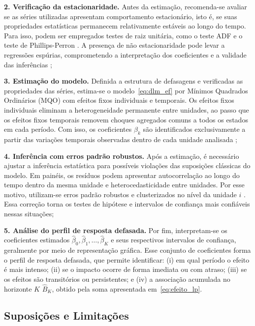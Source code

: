 \textbf{2. Verificação da estacionaridade.} Antes da estimação, recomenda-se avaliar
se as séries utilizadas apresentam comportamento estacionário, isto é, se suas
propriedades estatísticas permanecem relativamente estáveis ao longo do tempo. Para
isso, podem ser empregados testes de raiz unitária, como o teste ADF
\citep{dickey1979} e o teste de Phillips-Perron \citep{phillips1988}. A presença de
não estacionaridade pode levar a regressões espúrias, comprometendo a interpretação
dos coeficientes e a validade das inferências \citep{greene2012};

\textbf{3. Estimação do modelo.} Definida a estrutura de defasagens e verificadas as propriedades das séries, estima-se o modelo~\eqref{eq:dlm_ef} por Mínimos Quadrados Ordinários (MQO) com efeitos fixos individuais e temporais. Os efeitos fixos individuais eliminam a heterogeneidade permanente entre unidades, ao passo que os efeitos fixos temporais removem choques agregados comuns a todos os estados em cada período. Com isso, os coeficientes $\beta_k$ são identificados exclusivamente a partir das variações temporais observadas dentro de cada unidade analisada \citep{wooldridge2010};

\textbf{4. Inferência com erros padrão robustos.} Após a estimação, é necessário
ajustar a inferência estatística para possíveis violações das suposições clássicas do
modelo. Em painéis, os resíduos podem apresentar autocorrelação ao longo do tempo
dentro da mesma unidade e heterocedasticidade entre unidades. Por esse motivo,
utilizam-se erros padrão robustos e clusterizados no nível da unidade $i$
\citep{wooldridge2010}. Essa correção torna os testes de hipótese e intervalos de
confiança mais confiáveis nessas situações;

\textbf{5. Análise do perfil de resposta defasada.} Por fim, interpretam-se os
coeficientes estimados $\hat{\beta}_0, \hat{\beta}_1, \ldots, \hat{\beta}_K$ e seus
respectivos intervalos de confiança, geralmente por meio de representação gráfica.
Esse conjunto de coeficientes forma o perfil de resposta defasada, que permite
identificar: (i) em qual período o efeito é mais intenso; (ii) se o impacto ocorre
de forma imediata ou com atraso; (iii) se os efeitos são transitórios ou
persistentes; e (iv) a associação acumulada no horizonte $K$ $\hat{B}_K$, obtido
pela soma apresentada em~\eqref{eq:efeito_lp}.

\subsection{Suposições e Limitações}

